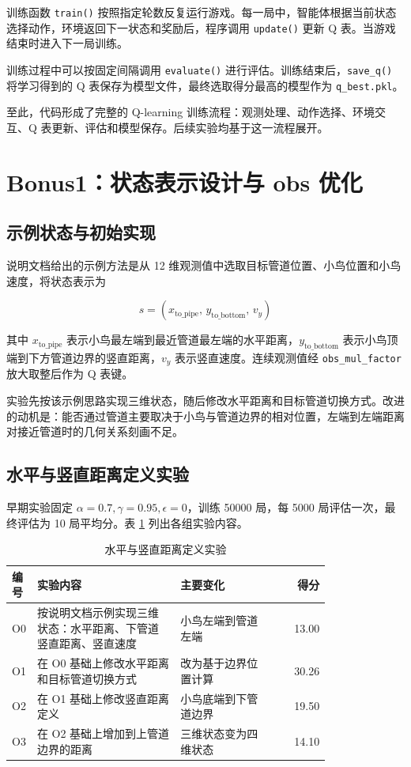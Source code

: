 \documentclass{zjureport}
\begin{document}
训练函数 \texttt{train()} 按照指定轮数反复运行游戏。每一局中，智能体根据当前状态选择动作，环境返回下一状态和奖励后，程序调用 \texttt{update()} 更新 Q 表。当游戏结束时进入下一局训练。

训练过程中可以按固定间隔调用 \texttt{evaluate()} 进行评估。训练结束后，\texttt{save\_q()} 将学习得到的 Q 表保存为模型文件，最终选取得分最高的模型作为 \texttt{q\_best.pkl}。

至此，代码形成了完整的 Q-learning 训练流程：观测处理、动作选择、环境交互、Q 表更新、评估和模型保存。后续实验均基于这一流程展开。

\clearpage

\section{Bonus1：状态表示设计与 obs 优化}

\subsection{示例状态与初始实现}

说明文档给出的示例方法是从 12 维观测值中选取目标管道位置、小鸟位置和小鸟速度，将状态表示为

\[
s=(x_{\mathrm{to\_pipe}},\,y_{\mathrm{to\_bottom}},\,v_y)
\]

其中 $x_{\mathrm{to\_pipe}}$ 表示小鸟最左端到最近管道最左端的水平距离，$y_{\mathrm{to\_bottom}}$ 表示小鸟顶端到下方管道边界的竖直距离，$v_y$ 表示竖直速度。连续观测值经 \texttt{obs\_mul\_factor} 放大取整后作为 Q 表键。

实验先按该示例思路实现三维状态，随后修改水平距离和目标管道切换方式。改进的动机是：能否通过管道主要取决于小鸟与管道边界的相对位置，左端到左端距离对接近管道时的几何关系刻画不足。

\subsection{水平与竖直距离定义实验}

早期实验固定 $\alpha=0.7,\gamma=0.95,\epsilon=0$，训练 50000 局，每 5000 局评估一次，最终评估为 10 局平均分。表 \ref{tab:obs-change} 列出各组实验内容。

\begin{table}[H]
    \centering
    \small
    \caption{水平与竖直距离定义实验}
    \label{tab:obs-change}
    \begin{tabular}{p{0.05\linewidth}p{0.45\linewidth}p{0.30\linewidth}r}
        \toprule
        编号 & 实验内容 & 主要变化 & 得分 \\
        \midrule
        O0 & 按说明文档示例实现三维状态：水平距离、下管道竖直距离、竖直速度 & 小鸟左端到管道左端 & 13.00 \\
        O1 & 在 O0 基础上修改水平距离和目标管道切换方式 & 改为基于边界位置计算 & 30.26 \\
        O2 & 在 O1 基础上修改竖直距离定义 & 小鸟底端到下管道边界 & 19.50 \\
        O3 & 在 O2 基础上增加到上管道边界的距离 & 三维状态变为四维状态 & 14.10 \\
        \bottomrule
    \end{tabular}
\end{table}
\end{document}
